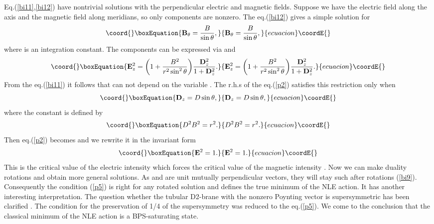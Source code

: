 \documentclass[a4paper,12pt]{article}
\begin{document}
Eq.(\ref{bi11},\ref{bi12}) have nontrivial solutions with the perpendicular 
electric and magnetic fields. Suppose we have the electric field along the \coordHE{} 
axis and the magnetic field along meridians, so only 
\coordHE{} components are nonzero.  
The eq.(\ref{bi12}) gives a simple solution for \myHighlight{${\m}_{\theta}$}\coordHE{}
\begin{equation}\coord{}\boxEquation{ 
{\m}_{\theta}=\frac{B}{\sin\theta},
\label{p1}
}{ 
{\m}_{\theta}=\frac{B}{\sin\theta},
}{ecuacion}\coordE{}\end{equation}
where \coordHE{} is an integration constant. The \coordHE{} components can be 
expressed via \coordHE{} and \myHighlight{${\m}_{\theta}$}\coordHE{}
\begin{equation}\coord{}\boxEquation{ 
\e^2_z=\bigg(1+\frac{B^2}{r^2\sin^2\theta}\bigg)
\frac{\d^2_z}{1+\d^2_z}.
\label{p2}
}{ 
\e^2_z=\bigg(1+\frac{B^2}{r^2\sin^2\theta}\bigg)
\frac{\d^2_z}{1+\d^2_z}.
}{ecuacion}\coordE{}\end{equation}
From the eq.(\ref{bi11}) it follows that \coordHE{} can not depend on the
variable \myHighlight{$\theta$}\coordHE{}. The r.h.s of the eq.(\ref{p2}) satisfies this 
restriction only when
\begin{equation}\coord{}\boxEquation{ 
{\d}_z=D\sin\theta,
\label{p3}
}{ 
{\d}_z=D\sin\theta,
}{ecuacion}\coordE{}\end{equation}
where the constant \coordHE{} is defined by
\begin{equation}\coord{}\boxEquation{ 
D^2B^2=r^2.
\label{p4}
}{ 
D^2B^2=r^2.
}{ecuacion}\coordE{}\end{equation}
Then eq.(\ref{p2}) becomes \coordHE{} and we rewrite it in the invariant 
form
\begin{equation}\coord{}\boxEquation{
{\e}^2=1.
\label{p5}
}{
{\e}^2=1.
}{ecuacion}\coordE{}\end{equation}
This is the critical value of the electric intensity which forces the critical 
value of the magnetic intensity \coordHE{}. Now we can make \coordHE{} duality 
rotations and obtain more general solutions. As \myHighlight{$\e$}\coordHE{} and \myHighlight{$\h$}\coordHE{} are unit mutually perpendicular vectors, they will stay such after rotations (\ref{bi9}).
Consequently the condition (\ref{p5}) is right for any rotated solution and 
defines the true minimum of the NLE action. It has another interesting 
interpretation. The question whether the tubular D2-brane with the nonzero 
Poynting vector is supersymmetric has been clarified \cite{1}. 
The condition for the preservation of 1/4 of the supersymmetry was reduced to
the eq.(\ref{p5}). We come to the conclusion that the classical minimum 
of the NLE action is a BPS-saturating state.
\end{document}
